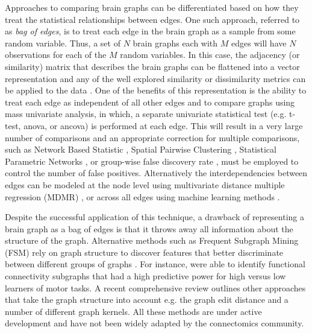 \documentclass{bmcart}
\begin{document}
Approaches to comparing brain graphs can be differentiated based on how they treat the statistical relationships between edges. One such approach, referred to as \emph{bag of edges}, is to treat each edge in the brain graph as a sample from some random variable. Thus, a set of $N$ brain graphs each with $M$ edges will have $N$ observations for each of the $M$ random variables. In this case, the adjacency (or similarity) matrix that describes the brain graphs can be flattened into a vector representation and any of the well explored similarity or dissimilarity metrics can be applied to the data \cite{Craddock2013}. One of the benefits of this representation is the ability to treat each edge as independent of all other edges and to compare graphs using mass univariate analysis, in which, a separate univariate statistical test (e.g. t-test, anova, or ancova) is performed at each edge. This will result in a very large number of comparisons and an appropriate correction for multiple comparisons, such as Network Based Statistic \cite{Zalesky2012}, Spatial Pairwise Clustering \cite{Zalesky2012}, Statistical Parametric Networks \cite{Ginestat2011}, or group-wise false discovery rate  \cite{Benjamini2001}, must be employed to control the number of false positives. Alternatively the interdependencies between edges can be modeled at the node level using multivariate distance multiple regression (MDMR) \cite{Shehzad2014}, or across all edges using machine learning methods \cite{Craddock2009, Dosenbach2010, Richiardi2011}.

Despite the successful application of this technique, a drawback of representing a brain graph as a bag of edges is that it throws away all information about the structure of the graph. Alternative methods such as Frequent Subgraph Mining (FSM) rely on graph structure to discover features that better discriminate between different groups of graphs \cite{Thoma2010}. For instance, \cite{Bogdanov2014} were able to identify functional connectivity subgraphs that had a high predictive power for high versus low learners of motor tasks. A recent comprehensive review \cite{Richiardi2013} outlines other approaches that take the graph structure into account e.g. the graph edit distance and a number of different graph kernels. All these methods are under active development and have not been widely adapted by the connectomics community.
\end{document}
